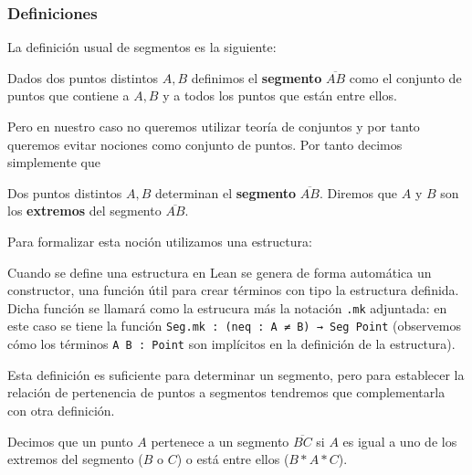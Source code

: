 
\subsubsection{Definiciones}\label{ssec:definiciones_orden}

La definición usual de segmentos es la siguiente:

\begin{defin*}[Segmentos]
	Dados dos puntos distintos $A, B$ definimos el \textbf{segmento}
	$\overline{AB}$ como el conjunto de puntos que contiene a $A, B$ y a todos los
	puntos que están entre ellos.
\end{defin*}

Pero en nuestro caso no queremos utilizar teoría de conjuntos y por tanto
queremos evitar nociones como \guillemotleft conjunto de puntos\guillemotright.
Por tanto decimos simplemente que

\begin{defin*}[Segmentos]
	Dos puntos distintos $A, B$ determinan el \textbf{segmento} $\overline{AB}$.
	Diremos que $A$ y $B$ son los \textbf{extremos} del segmento $\overline{AB}$.
\end{defin*}

Para formalizar esta noción utilizamos una estructura:


Cuando se define una estructura en Lean se genera de forma automática
un constructor, una función útil para crear términos con tipo la estructura
definida. Dicha función se llamará como la estrucura más la notación
\lstinline{.mk} adjuntada: en este caso se tiene la función
\lstinline{Seg.mk : (neq : A ≠ B) → Seg Point} (observemos cómo los términos
\lstinline{A B : Point} son implícitos en la definición de la estructura).

Esta definición es suficiente para determinar un segmento, pero para establecer
la relación de pertenencia de puntos a segmentos tendremos que complementarla
con otra definición.

\begin{defin*}
	Decimos que un punto $A$ pertenece a un segmento $\overline{BC}$ si $A$ es
	igual a uno de los extremos del segmento ($B$ o $C$) o está entre ellos
	($B * A * C$).
\end{defin*}


